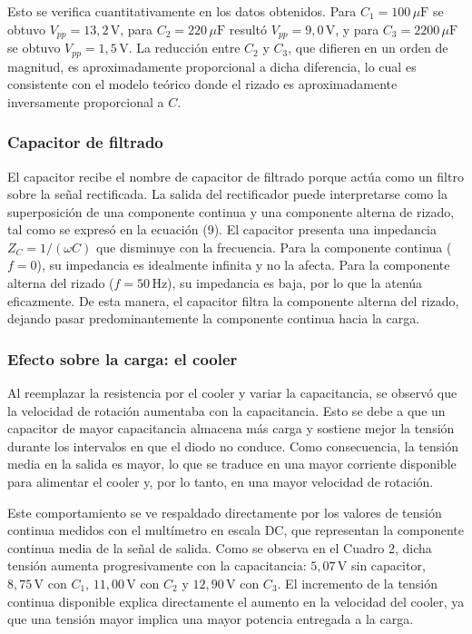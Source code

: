 Esto se verifica cuantitativamente en los datos obtenidos. Para $C_1 = 100\,\mu\text{F}$ se obtuvo $V_{pp} = 13{,}2\,\text{V}$, para $C_2 = 220\,\mu\text{F}$ resultó $V_{pp} = 9{,}0\,\text{V}$, y para $C_3 = 2200\,\mu\text{F}$ se obtuvo $V_{pp} = 1{,}5\,\text{V}$. La reducción entre $C_2$ y $C_3$, que difieren en un orden de magnitud, es aproximadamente proporcional a dicha diferencia, lo cual es consistente con el modelo teórico donde el rizado es aproximadamente inversamente proporcional a $C$.

\subsubsection{Capacitor de filtrado}

El capacitor recibe el nombre de capacitor de filtrado porque actúa como un filtro sobre la señal rectificada. La salida del rectificador puede interpretarse como la superposición de una componente continua y una componente alterna de rizado, tal como se expresó en la ecuación (9). El capacitor presenta una impedancia $Z_C = 1/(\omega C)$ que disminuye con la frecuencia. Para la componente continua ($f = 0$), su impedancia es idealmente infinita y no la afecta. Para la componente alterna del rizado ($f = 50\,\text{Hz}$), su impedancia es baja, por lo que la atenúa eficazmente. De esta manera, el capacitor filtra la componente alterna del rizado, dejando pasar predominantemente la componente continua hacia la carga.

\subsubsection{Efecto sobre la carga: el cooler}

Al reemplazar la resistencia por el cooler y variar la capacitancia, se observó que la velocidad de rotación aumentaba con la capacitancia. Esto se debe a que un capacitor de mayor capacitancia almacena más carga y sostiene mejor la tensión durante los intervalos en que el diodo no conduce. Como consecuencia, la tensión media en la salida es mayor, lo que se traduce en una mayor corriente disponible para alimentar el cooler y, por lo tanto, en una mayor velocidad de rotación.

Este comportamiento se ve respaldado directamente por los valores de tensión continua medidos con el multímetro en escala DC, que representan la componente continua media de la señal de salida. Como se observa en el Cuadro 2, dicha tensión aumenta progresivamente con la capacitancia: $5{,}07\,\text{V}$ sin capacitor, $8{,}75\,\text{V}$ con $C_1$, $11{,}00\,\text{V}$ con $C_2$ y $12{,}90\,\text{V}$ con $C_3$. El incremento de la tensión continua disponible explica directamente el aumento en la velocidad del cooler, ya que una tensión mayor implica una mayor potencia entregada a la carga.


